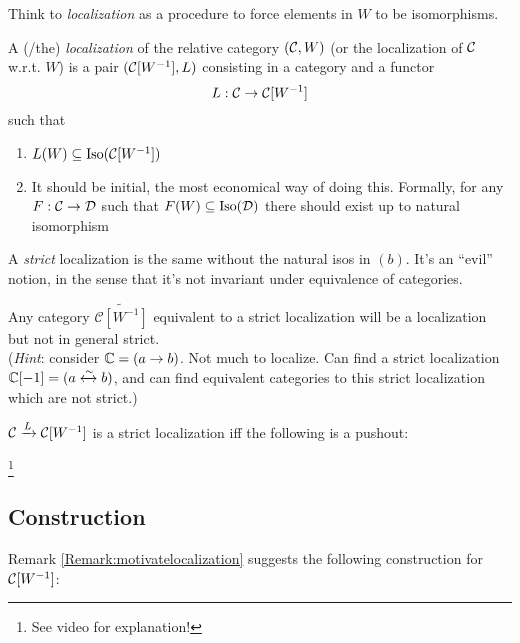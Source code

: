 \documentclass[class=report, crop=false,a4paper,twoside]{standalone}
\begin{document}
Think to \emph{localization} as a procedure to force elements in $W$ to be isomorphisms.
\begin{definition}
	A (/the) \emph{localization} of the relative category $(\mathcal{C},W)$ (or the localization of $\mathcal{C}$ w.r.t. $W$) is a pair $(\mathcal{C}[W^{-1}] , L)$ consisting in a category and a functor
	\[
	L: \mathcal{C} \to \mathcal{C}[W^{-1}]
	\]
	such that
	\begin{enumerate}
		\item $L(W) \subseteq \operatorname{Iso}(\mathcal{C}[W^{-1}])$
		\item It should be initial, the most economical way of doing this. Formally, for any $F: \mathcal{C} \to \mathcal{D}$ such that $F(W) \subseteq \operatorname{Iso}(\mathcal{D})$ there should exist up to natural isomorphism
		\begin{center}
		\end{center}
	\end{enumerate}
	A \emph{strict} localization is the same without the natural isos in $(b)$. It's an ``evil'' notion, in the sense that it's not invariant under equivalence of categories.
\end{definition}

	\begin{exercise}
	Any category $\widetilde{\mathcal{C}[W^{-1}]}$ equivalent to a strict localization will be a localization but not in general strict.
	\\
	(\emph{Hint}: consider $\mathbb{C} = (a \to b)$. Not much to localize. Can find a strict localization $\mathbb{C}[-1] = (a \xleftrightarrow{\sim} b)$, and can find equivalent categories to this strict localization which are not strict.)
	\end{exercise}

\begin{remark}\label{Remark:motivatelocalization}
	$\mathcal{C} \xrightarrow{L} \mathcal{C}[W^{-1}]$ is a strict localization iff the following is a pushout:
	
	\footnote{See video for explanation!}
\end{remark}

\subsection{Construction}
Remark \ref{Remark:motivatelocalization} suggests the following construction for $\mathcal{C}[W^{-1}]$:
\end{document}
